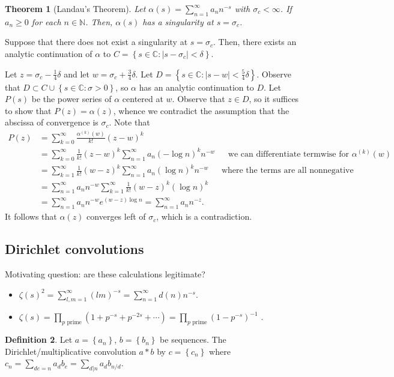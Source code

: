 \documentclass[11pt]{article}
\newtheorem{thm}{Theorem}[section]
\theoremstyle{definition}
\newtheorem{defn}[thm]{Definition}
\newcommand{\set}[1]{\left\{ #1 \right\}}
\newcommand{\s}[0]{\sigma}
\newcommand{\abs}[1]{\left\lvert#1\right\rvert} %
\newcommand{\NN}{\mathbb{N}}
\newcommand{\CC}{\mathbb{C}}
\begin{document}
\begin{thm}[Landau's Theorem]
Let $\alpha(s)=\sum_{n=1}^\infty a_nn^{-s}$ with $\s_c<\infty$. If $a_n\ge0$ for each
$n\in\NN$. Then, $\alpha(s)$ has a singularity at $s=\s_c$.
\end{thm}
\proof
Suppose that there does not exist a singularity at $s=\s_c$. Then, there exists an analytic
continuation of $\alpha$ to $C=\set{s\in\CC:\abs{s-\s_c}<\delta}$.

Let $z=\s_c-\frac14\delta$ and let $w=\s_c+\frac34\delta$. Let
$D=\set{s\in\CC:\abs{s-w}<\frac54\delta}$. Observe that $D\subset C\cup\set{s\in\CC:\s>0}$,
so $\alpha$ has an analytic continuation to $D$. Let $P(s)$ be the power series of $\alpha$
centered at $w$. Observe that $z\in D$, so it suffices to show that $P(z)=\alpha(z)$,
whence we contradict the assumption that the abscissa of convergence is $\s_c$. Note that
\begin{align*}
P(z) &= \sum_{k=0}^\infty \frac{\alpha^{(k)}(w)}{k!} (z-w)^k \\
&= \sum_{k=0}^\infty \frac{1}{k!}(z-w)^k \sum_{n=1}^\infty a_n(-\log n)^k n^{-w}
~~~~~~~\text{we can differentiate termwise for }\alpha^{(k)}(w) \\
&= \sum_{k=1}^\infty \frac{1}{k!}(w-z)^k \sum_{n=1}^\infty a_n(\log n)^k n^{-w}
~~~~~~~\text{where the terms are all nonnegative} \\
&= \sum_{n=1}^\infty a_nn^{-w} \sum_{k=1}^\infty \frac{1}{k!}(w-z)^k(\log n)^k \\
&= \sum_{n=1}^\infty a_nn^{-w} e^{(w-z)\log n} = \sum_{n=1}^\infty a_nn^{-z} .
\end{align*}
It follows that $\alpha(z)$ converges left of $\s_c$, which is a contradiction.
\qedhere


\subsection{Dirichlet convolutions}

Motivating question: are these calculations legitimate?
\begin{itemize}
\item $\zeta(s)^2 = \sum_{l,m=1}^\infty (lm)^{-s} = \sum_{n=1}^\infty d(n)n^{-s}$.
\item $\zeta(s) = \prod_{p\text{ prime}}(1+p^{-s}+p^{-2s}+\cdots) = \prod_{p\text{ prime}}
(1-p^{-s})^{-1}$ .
\end{itemize}

\begin{defn}
  Let $a=\set{a_n}$, $b=\set{b_n}$ be sequences. The Dirichlet/multiplicative convolution
  $a*b$ by $c=\set{c_n}$ where $c_n = \sum_{de=n}a_db_e = \sum_{d|n}a_db_{n/d}$.
\end{defn}
\end{document}
